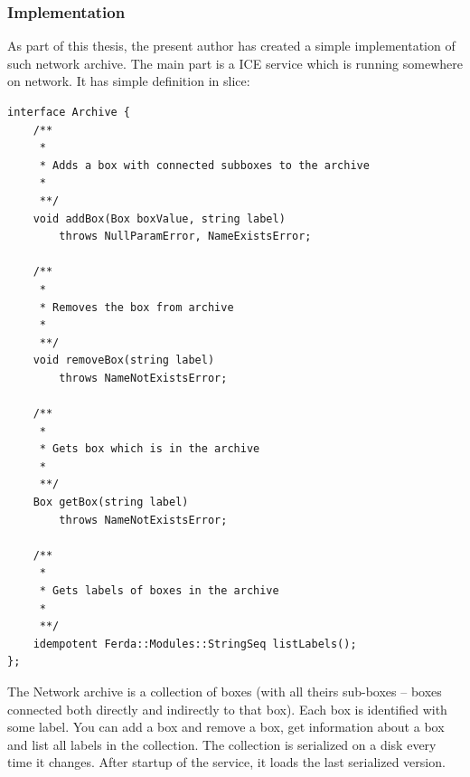 \documentclass[a4paper,12pt]{book}
\begin{document}
\subsubsection{Implementation}
As part of this thesis, the present author has created a simple implementation of such network archive. The main part is a ICE service which is running somewhere on network. It has simple definition in slice:
\begin{verbatim}
interface Archive {
	/**
	 *
	 * Adds a box with connected subboxes to the archive
	 *
	 **/
	void addBox(Box boxValue, string label)
		throws NullParamError, NameExistsError;

	/**
	 *
	 * Removes the box from archive
	 *
	 **/
	void removeBox(string label)
		throws NameNotExistsError;

	/**
	 *
	 * Gets box which is in the archive
	 *
	 **/
	Box getBox(string label)
		throws NameNotExistsError;

	/**
	 *
	 * Gets labels of boxes in the archive
	 *
	 **/
	idempotent Ferda::Modules::StringSeq listLabels();
};
\end{verbatim}

The Network archive is a collection of boxes (with all theirs sub-boxes -- boxes connected both directly and indirectly to that box). Each box is identified with some label. You can add a box and remove a box, get information about a box and list all labels in the collection. The collection is serialized on a disk every time it changes. After startup of the service, it loads the last serialized version.
\end{document}
